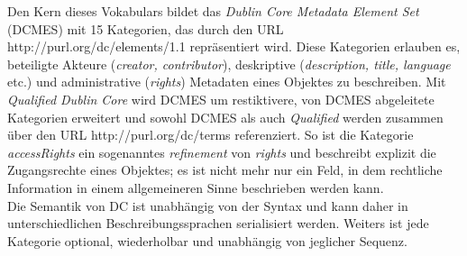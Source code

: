 \documentclass{article}
\begin{document}
        Den Kern dieses Vokabulars bildet das \emph{Dublin Core Metadata Element Set }(DCMES) mit 15 Kategorien, das durch den URL http://purl.org/dc/elements/1.1 repräsentiert wird. Diese Kategorien erlauben es, beteiligte Akteure (\emph{creator, contributor}), deskriptive (\emph{description, title, language} etc.) und administrative (\emph{rights}) Metadaten eines Objektes zu beschreiben. Mit \emph{Qualified Dublin Core} wird DCMES um restiktivere, von DCMES abgeleitete Kategorien erweitert und sowohl DCMES als auch \emph{Qualified} werden zusammen über den URL http://purl.org/dc/terms referenziert. So ist die Kategorie \emph{accessRights} ein sogenanntes \emph{refinement} von \emph{rights} und beschreibt explizit die Zugangsrechte eines Objektes; es ist nicht mehr nur ein Feld, in dem rechtliche Information in einem allgemeineren Sinne beschrieben werden kann.\\
            
        Die Semantik von DC ist unabhängig von der Syntax und kann daher in unterschiedlichen Beschreibungssprachen serialisiert werden. Weiters ist jede Kategorie optional, wiederholbar und unabhängig von jeglicher Sequenz.\\
            
\end{document}
